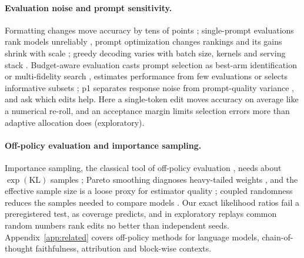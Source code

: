 \paragraph{Evaluation noise and prompt sensitivity.} Formatting changes move accuracy by tens of
points \citep{sclar2024formatspread,su2025single}; single-prompt evaluations rank models unreliably
\citep{mizrahi2024multiprompt}, prompt optimization changes rankings
\citep{sadjoli2025optimization} and its gains shrink with scale \citep{zhou2025scale}; greedy
decoding varies with batch size, kernels and serving stack
\citep{yuan2025nondeterminism,atil2025nondeterminism,he2025nondeterminism}. Budget-aware evaluation
casts prompt selection as best-arm identification or multi-fidelity search
\citep{shi2024triple,schneider2025hbbops}, estimates performance from few evaluations
\citep{polo2024prompteval} or selects informative subsets \citep{nian2026sess}; p1 separates
response noise from prompt-quality variance \citep{gao2026p1}, and \citet{gong2026why} ask which
edits help. Here a single-token edit moves accuracy on average like a numerical re-roll, and an
acceptance margin limits selection errors more than adaptive allocation does (exploratory).

\paragraph{Off-policy evaluation and importance sampling.} Importance sampling, the classical tool
of off-policy evaluation \citep{precup2000eligibility}, needs about $\exp(\mathrm{KL})$ samples
\citep{chatterjee2018sample}; Pareto smoothing diagnoses
heavy-tailed weights \citep{vehtari2024psis}, and the effective sample size is a loose proxy for
estimator quality \citep{elvira2022ess}; coupled randomness reduces the samples needed to compare
models \citep{corvelobenz2025coupled}. Our exact likelihood ratios fail a preregistered test, as
coverage predicts, and in exploratory replays common random numbers rank edits no better than
independent seeds. Appendix~\ref{app:related} covers off-policy methods for language models,
chain-of-thought faithfulness, attribution and block-wise contexts.
